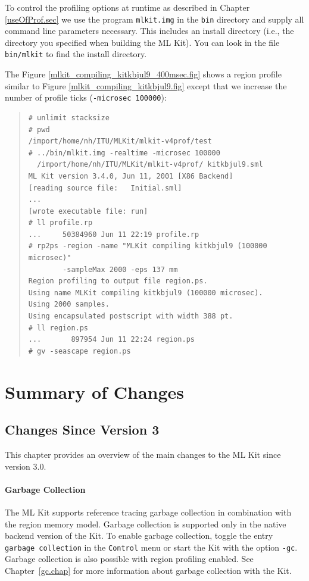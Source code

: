 \documentclass[12pt]{book}
\begin{document}
To control the profiling options at runtime as described in Chapter
\ref{useOfProf.sec} we use the program \texttt{mlkit.img} in the
\texttt{bin} directory and supply all command line parameters
necessary. This includes an install directory (i.e., the directory you
specified when building the ML Kit). You can look in the file
\texttt{bin/mlkit} to find the install directory. 

The Figure \ref{mlkit_compiling_kitkbjul9_400msec.fig} shows a region
profile similar to Figure \ref{mlkit_compiling_kitkbjul9.fig} except that
we increase the number of profile ticks (\texttt{-microsec 100000}):

\begin{small}
\begin{quote}
\begin{verbatim}
# unlimit stacksize
# pwd
/import/home/nh/ITU/MLKit/mlkit-v4prof/test
# ../bin/mlkit.img -realtime -microsec 100000 
  /import/home/nh/ITU/MLKit/mlkit-v4prof/ kitkbjul9.sml 
ML Kit version 3.4.0, Jun 11, 2001 [X86 Backend]
[reading source file:   Initial.sml]
...
[wrote executable file: run]
# ll profile.rp 
...     50384960 Jun 11 22:19 profile.rp
# rp2ps -region -name "MLKit compiling kitkbjul9 (100000 microsec)" 
        -sampleMax 2000 -eps 137 mm
Region profiling to output file region.ps.
Using name MLKit compiling kitkbjul9 (100000 microsec).
Using 2000 samples.
Using encapsulated postscript with width 388 pt.
# ll region.ps 
...       897954 Jun 11 22:24 region.ps
# gv -seascape region.ps
\end{verbatim}
\end{quote}
\end{small}
                                

\chapter{Summary of Changes}

\section{Changes Since Version 3}
%
This chapter provides an overview of the main changes to the ML Kit
since version 3.0.

\subsubsection*{Garbage Collection}
%
The ML Kit supports reference tracing garbage collection in
combination with the region memory model. Garbage collection is
supported only in the native backend version of the Kit. To enable
garbage collection, toggle the entry {\tt garbage collection} in the
{\tt Control} menu or start the Kit with the option {\tt -gc}. Garbage
collection is also possible with region profiling enabled. See
Chapter~\ref{gc.chap} for more information about garbage collection
with the Kit.
\end{document}
